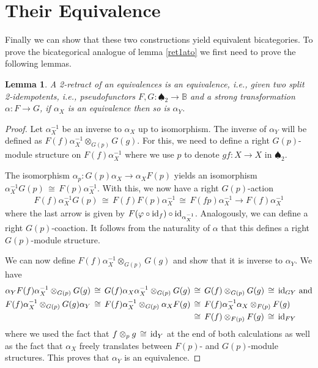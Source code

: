 \documentclass[12pt,oneside,reqno,a4paper]{article}
\newtheorem{lemma}[theorem]{Lemma}
\theoremstyle{definition}
\newcommand{\spd}{\spadesuit}
\renewcommand{\phi}{\varphi}
\newcommand{\iso}{\,\cong\,}
\newcommand{\id}{\textup{id}}
\newcommand{\bB}{\mathbb{B}}
\begin{document}
\section{Their Equivalence} \label{sec6}

Finally we can show that these two constructions yield equivalent bicategories. To prove the bicategorical analogue of lemma \ref{ret1ato} we first need to prove the following lemmas.

\begin{lemma} \label{splitequiv}
A 2-retract of an equivalences is an equivalence, i.e., given two split 2-idempotents, i.e., pseudofunctors $F,G:\spd_2\to\bB$ and a strong transformation $\alpha:F\to G$, if $\alpha_X$ is an equivalence then so is $\alpha_Y$.
\end{lemma}

\begin{proof}
Let $\alpha_X^{-1}$ be an inverse to $\alpha_X$ up to isomorphism. The inverse of $\alpha_Y$ will be defined as $F(f)\alpha_X^{-1}\otimes_{G(p)}G(g)$. For this, we need to define a right $G(p)$-module structure on $F(f)\alpha_X^{-1}$ where we use $p$ to denote $gf:X\to X$ in $\spd_2$.

The isomorphism $\alpha_p:G(p)\alpha_X\to\alpha_X F(p)$ yields an isomorphism $\alpha_X^{-1}G(p)\iso F(p)\alpha_X^{-1}$. With this, we now have a right $G(p)$-action
\begin{align*}
F(f)\alpha_X^{-1}G(p)\iso F(f)F(p)\alpha_X^{-1}\iso F(fp)\alpha_X^{-1}\to F(f)\alpha_X^{-1}
\end{align*}
where the last arrow is given by $F(\phi\circ\id_f)\circ\id_{\alpha_X^{-1}}$. Analogously, we can define a right $G(p)$-coaction. It follows from the naturality of $\alpha$ that this defines a right $G(p)$-module structure.

We can now define $F(f)\alpha_X^{-1}\otimes_{G(p)}G(g)$ and show that it is inverse to $\alpha_Y$. We have
\begin{align*}
\alpha_Y F(f)\alpha_X^{-1}\otimes_{G(p)}G(g) \iso G(f)\alpha_X \alpha_X^{-1}\otimes_{G(p)}G(g) & \iso G(f)\otimes_{G(p)}G(g)\iso\id_{GY} \text{  and} \\ 
F(f)\alpha_X^{-1}\otimes_{G(p)}G(g)\alpha_Y \iso F(f)\alpha_X^{-1}\otimes_{G(p)}\alpha_X F(g) & \iso F(f)\alpha_X^{-1}\alpha_X\otimes_{F(p)}F(g) \\
& \iso F(f)\otimes_{F(p)}F(g)\iso \id_{FY}
\end{align*}
where we used the fact that $f\otimes_p g\iso \id_Y$ at the end of both calculations as well as the fact that $\alpha_X$ freely translates between $F(p)$- and $G(p)$-module structures. This proves that $\alpha_Y$ is an equivalence.
\end{proof}
\end{document}
